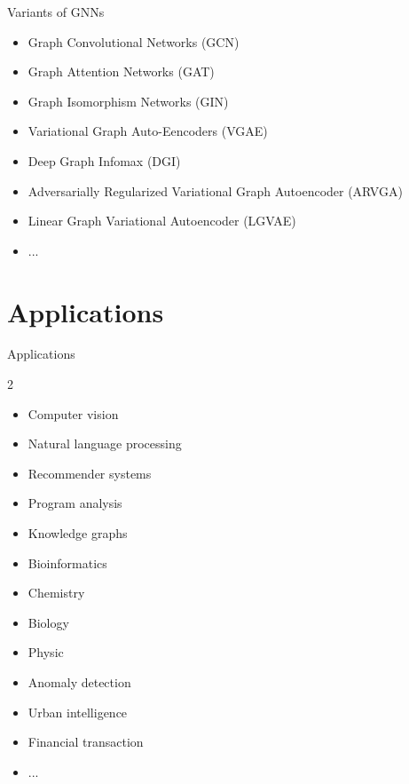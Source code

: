\documentclass{beamer}
\begin{document}
    \begin{frame}{Variants of GNNs}
        \begin{itemize}
            \item Graph Convolutional Networks (GCN) \cite{kipf2016semi}
            \item Graph Attention Networks (GAT) \cite{velickovic2017graph}
            \item Graph Isomorphism Networks (GIN) \cite{xu2018powerful}
            
            \item Variational Graph Auto-Eencoders (VGAE) \cite{kipf2016variational}
            \item Deep Graph Infomax (DGI) \cite{velivckovic2018deep}
            \item Adversarially Regularized Variational Graph Autoencoder (ARVGA) \cite{pan2018adversarially}
            \item Linear Graph Variational Autoencoder (LGVAE) \cite{salha2021simple}
            \item ...
        \end{itemize}
    \end{frame}
    
\section{Applications}
    \begin{frame}{Applications}
        \begin{multicols}{2}
            \begin{itemize}
                \item Computer vision
                \item Natural language processing
                \item Recommender systems
                \item Program analysis
                \item Knowledge graphs
                \item Bioinformatics
                \item Chemistry
                \item Biology
                \item Physic
                \item Anomaly detection
                \item Urban intelligence
                \item Financial transaction
                \item ...
            \end{itemize}
        \end{multicols}          
    \end{frame}
\end{document}
